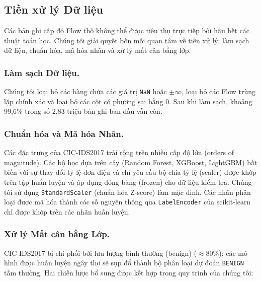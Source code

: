 \subsection{Tiền xử lý Dữ liệu}
\label{sec:bg-preproc}

Các bản ghi cấp độ Flow thô không thể được tiêu thụ trực tiếp bởi hầu hết các thuật toán học. Chúng tôi giải quyết bốn mối quan tâm về tiền xử lý: làm sạch dữ liệu, chuẩn hóa, mã hóa nhãn và xử lý mất cân bằng lớp.

\subsubsection*{Làm sạch Dữ liệu.}
Chúng tôi loại bỏ các hàng chứa các giá trị \texttt{NaN} hoặc $\pm\infty$, loại bỏ các Flow trùng lặp chính xác và loại bỏ các cột có phương sai bằng 0. Sau khi làm sạch, khoảng 99,6\% trong số 2,83 triệu bản ghi ban đầu vẫn còn.

\subsubsection*{Chuẩn hóa và Mã hóa Nhãn.}
Các đặc trưng của CIC-IDS2017 trải rộng trên nhiều cấp độ lớn (orders of magnitude). Các bộ học dựa trên cây (Random Forest, XGBoost, LightGBM) bất biến với sự thay đổi tỷ lệ đơn điệu và chỉ yêu cầu bộ chia tỷ lệ (scaler) được khớp trên tập huấn luyện và áp dụng đóng băng (frozen) cho dữ liệu kiểm tra. Chúng tôi sử dụng \texttt{StandardScaler} (chuẩn hóa Z-score) làm mặc định. Các nhãn phân loại được mã hóa thành các số nguyên thông qua \texttt{LabelEncoder} của scikit-learn chỉ được khớp trên các nhãn huấn luyện.

\subsubsection*{Xử lý Mất cân bằng Lớp.}
CIC-IDS2017 bị chi phối bởi lưu lượng bình thường (benign) ($\approx 80\%$); các mô hình được huấn luyện ngây thơ sẽ sụp đổ thành bộ phân loại dự đoán \texttt{BENIGN} tầm thường. Hai chiến lược bổ sung được kết hợp trong quy trình của chúng tôi:

